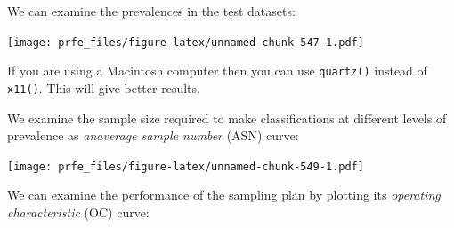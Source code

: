 \documentclass[12pt,a4paper]{book}
\newenvironment{Shaded}{\begin{snugshade}}{\end{snugshade}}
\newcommand{\DataTypeTok}[1]{\textcolor[rgb]{0.13,0.29,0.53}{#1}}
\newcommand{\KeywordTok}[1]{\textcolor[rgb]{0.13,0.29,0.53}{\textbf{#1}}}
\newcommand{\NormalTok}[1]{#1}
\newcommand{\OperatorTok}[1]{\textcolor[rgb]{0.81,0.36,0.00}{\textbf{#1}}}
\newcommand{\StringTok}[1]{\textcolor[rgb]{0.31,0.60,0.02}{#1}}
\theoremstyle{definition}
\theoremstyle{definition}
\theoremstyle{definition}
\theoremstyle{remark}
\begin{document}
We can examine the prevalences in the test datasets:

\begin{Shaded}
\end{Shaded}

\texttt{[image: prfe\_files/figure-latex/unnamed-chunk-547-1.pdf]}

If you are using a Macintosh computer then you can use \texttt{quartz()}
instead of \texttt{x11()}. This will give better results.

We examine the sample size required to make classifications at different
levels of prevalence as \emph{anaverage sample number} (ASN) curve:

\begin{Shaded}
\end{Shaded}

\texttt{[image: prfe\_files/figure-latex/unnamed-chunk-549-1.pdf]}

We can examine the performance of the sampling plan by plotting its
\emph{operating characteristic} (OC) curve:

\begin{Shaded}
\end{Shaded}
\end{document}
